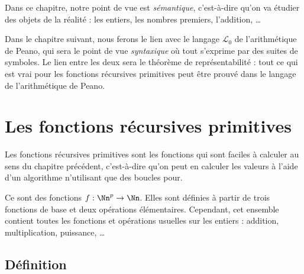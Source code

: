 \documentclass[11pt,class=report,crop=false]{standalone}
\begin{document}







Dans ce chapitre, notre point de vue est \emph{sémantique}, c'est-à-dire qu'on va étudier des objets de la \og{}réalité\fg{} : les entiers, les nombres premiers, l'addition, \dots

Dans le chapitre suivant, nous ferons le lien avec le langage $\mathcal{L}_0$ de l'arithmétique de Peano, qui sera le point de vue \emph{syntaxique} où tout s'exprime par des suites de symboles. Le lien entre les deux sera le théorème de représentabilité : tout ce qui est vrai pour les fonctions récursives primitives peut être prouvé dans le langage de l'arithmétique de Peano.

\section{Les fonctions récursives primitives} 

Les fonctions récursives primitives sont les fonctions qui sont \og{}faciles à calculer\fg{} au sens du chapitre précédent, c'est-à-dire qu'on peut en calculer les valeurs à l'aide d'un algorithme n'utilisant que des boucles \og{}pour\fg{}.

Ce sont des fonctions $f : \Nn^p \to \Nn$. Elles sont définies à partir de trois fonctions de base et deux opérations élémentaires. Cependant, cet ensemble contient toutes les fonctions et opérations usuelles sur les entiers : addition, multiplication, puissance, \dots


\subsection{Définition} 
\end{document}
